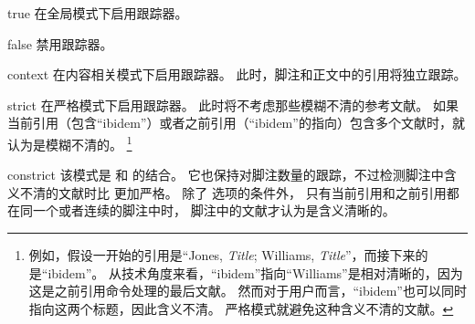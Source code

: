 \begin{optionlist}
\begin{valuelist}
\item[true] %
在全局模式下启用跟踪器。
\item[false] %
禁用跟踪器。
\item[context] %
在内容相关模式下启用跟踪器。
此时，脚注和正文中的引用将独立跟踪。
\item[strict] %
在严格模式下启用跟踪器。
此时将不考虑那些模糊不清的参考文献。
如果当前引用（包含“ibidem”）或者之前引用（“ibidem”的指向）包含多个文献时，就认为是模糊不清的。
\footnote{%
	例如，假设一开始的引用是“Jones, \emph{Title}; Williams, \emph{Title}”，而接下来的是“ibidem”。
	从技术角度来看，“ibidem”指向“Williams”是相对清晰的，因为这是之前引用命令处理的最后文献。
	然而对于用户而言，“ibidem”也可以同时指向这两个标题，因此含义不清。
	严格模式就避免这种含义不清的文献。}
\item[constrict] %
该模式是  和  的结合。
它也保持对脚注数量的跟踪，不过检测脚注中含义不清的文献时比  更加严格。
除了  选项的条件外，
只有当前引用和之前引用都在同一个或者连续的脚注中时，
脚注中的文献才认为是含义清晰的。
\end{valuelist}


\end{optionlist}
